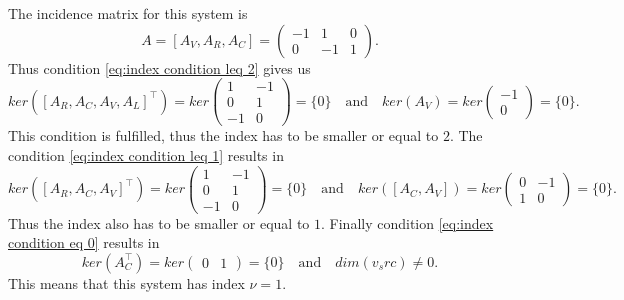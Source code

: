 \begin{example1}
	The incidence matrix for this system is
	\begin{displaymath}
		A = [A_V, A_R, A_C] = 
		\left(
		\begin{matrix}
			-1 & 1 & 0 \\
			0 & -1 & 1 
		\end{matrix}
		\right).
	\end{displaymath} 
	Thus condition \eqref{eq:index condition leq 2} gives us
	\begin{displaymath}
		ker([A_R, A_C, A_V, A_L]^\top) = ker
		\left(
		\begin{matrix}
			1 & -1 \\
			0 & 1 \\
			-1 & 0
		\end{matrix}
		\right)
		= \{0\} 
		\quad \text{and} \quad 
		ker(A_V) = ker
		\left(
		\begin{matrix}
			-1 \\
			0
		\end{matrix}
		\right) = \{0\}.
	\end{displaymath}
	This condition is fulfilled, thus the index has to be smaller or equal to $2$.
	The condition \eqref{eq:index condition leq 1} results in
	\begin{displaymath}
		ker([A_R, A_C, A_V]^\top) = ker
		\left(
		\begin{matrix}
			1 & -1 \\
			0 & 1 \\
			-1 & 0
		\end{matrix}
		\right) 
		= \{0\} 
		\quad \text{and} \quad
		ker([A_C, A_V]) = ker
		\left(
		\begin{matrix}
			0 & -1\\
			1 & 0
		\end{matrix}
		\right) = \{0\}.
	\end{displaymath}
	Thus the index also has to be smaller or equal to $1$. 
	Finally condition \eqref{eq:index condition eq 0} results in
	\begin{displaymath}
		ker(A_C^\top) = ker
		\left(
		\begin{matrix}
			0 & 1
		\end{matrix}
		\right) 
		= \{0\} 
		\quad \text{and} \quad
		dim(v_src) \neq 0.
	\end{displaymath}
	This means that this system has index $\nu = 1$.
\end{example1}


